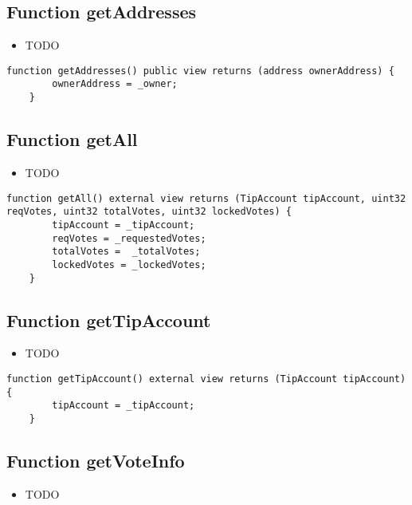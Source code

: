 \subsection{Function getAddresses}

\begin{itemize}
\item TODO
\end{itemize}

\begin{lstlisting}[firstnumber=224]
    function getAddresses() public view returns (address ownerAddress) {
        ownerAddress = _owner;
    }
\end{lstlisting}

\subsection{Function getAll}

\begin{itemize}
\item TODO
\end{itemize}

\begin{lstlisting}[firstnumber=207]
    function getAll() external view returns (TipAccount tipAccount, uint32 reqVotes, uint32 totalVotes, uint32 lockedVotes) {
        tipAccount = _tipAccount;
        reqVotes = _requestedVotes;
        totalVotes =  _totalVotes;
        lockedVotes = _lockedVotes;
    }
\end{lstlisting}

\subsection{Function getTipAccount}

\begin{itemize}
\item TODO
\end{itemize}

\begin{lstlisting}[firstnumber=214]
    function getTipAccount() external view returns (TipAccount tipAccount) {
        tipAccount = _tipAccount;
    }
\end{lstlisting}

\subsection{Function getVoteInfo}

\begin{itemize}
\item TODO
\end{itemize}

